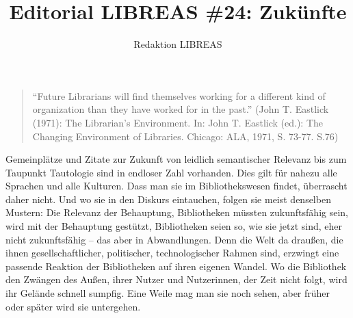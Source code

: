 \documentclass[a4paper,
fontsize=11pt,
oneside,
numbers=noperiodatend,
parskip=half-,
bibliography=totoc,
final
]{scrartcl}
\title{\LARGE{Editorial LIBREAS \#24: Zukünfte}} %
\author{Redaktion LIBREAS} %
\date{}
\begin{document}
\maketitle
\thispagestyle{fancyplain} 





\begin{quote}
\enquote{Future Librarians will find themselves working for a different
kind of organization than they have worked for in the past.} (John T.
Eastlick (1971): The Librarian's Environment. In: John T. Eastlick
(ed.): The Changing Environment of Libraries. Chicago: ALA, 1971, S.
73-77. S.76)
\end{quote}

Gemeinplätze und Zitate zur Zukunft von leidlich semantischer Relevanz
bis zum Taupunkt Tautologie sind in endloser Zahl vorhanden. Dies gilt
für nahezu alle Sprachen und alle Kulturen. Dass man sie im
Bibliothekswesen findet, überrascht daher nicht. Und wo sie in den
Diskurs eintauchen, folgen sie meist denselben Mustern: Die Relevanz der
Behauptung, Bibliotheken müssten zukunftsfähig sein, wird mit der
Behauptung gestützt, Bibliotheken seien so, wie sie jetzt sind, eher
nicht zukunftsfähig -- das aber in Abwandlungen. Denn die Welt da
draußen, die ihnen gesellschaftlicher, politischer, technologischer
Rahmen sind, erzwingt eine passende Reaktion der Bibliotheken auf ihren
eigenen Wandel. Wo die Bibliothek den Zwängen des Außen, ihrer Nutzer
und Nutzerinnen, der Zeit nicht folgt, wird ihr Gelände schnell sumpfig.
Eine Weile mag man sie noch sehen, aber früher oder später wird sie
untergehen.
\end{document}
